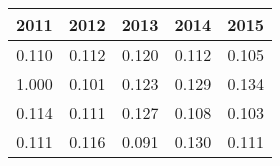 \begin{tabular}{rrrrr}
\toprule
2011 & 2012 & 2013 & 2014 & 2015 \\
\midrule
0.110 & 0.112 & 0.120 & 0.112 & 0.105 \\
1.000 & 0.101 & 0.123 & 0.129 & 0.134 \\
0.114 & 0.111 & 0.127 & 0.108 & 0.103 \\
0.111 & 0.116 & 0.091 & 0.130 & 0.111 \\
\bottomrule
\end{tabular}
